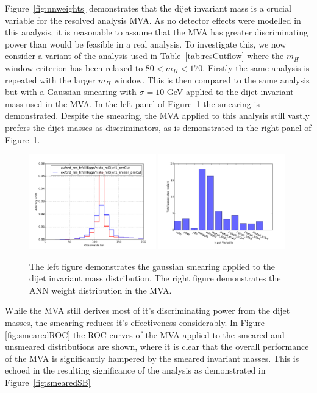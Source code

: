 \documentclass[12pt]{article}
\begin{document}
Figure~\ref{fig:nnweights} demonstrates that the dijet invariant mass is a crucial variable for the resolved analysis MVA. As no detector effects were modelled in this analysis, it is reasonable to assume that the MVA has greater discriminating power than would be feasible in a real analysis. To investigate this, we now consider a variant of the analysis used in Table~\ref{tab:resCutflow} where the $m_H$ window criterion has been relaxed to $80 < m_H < 170$. Firstly the same analysis is repeated with the larger $m_H$ window. This is then compared to the same analysis but with a Gaussian smearing with $\sigma=10$ GeV applied to the dijet invariant mass used in the MVA. In the left panel of Figure~\ref{fig:invMsmear} the smearing is demonstrated. Despite the smearing, the MVA applied to this analysis still vastly prefers the dijet masses as discriminators, as is demonstrated in the right panel of Figure~\ref{fig:invMsmear}.
            
\begin{figure}[h!]
\begin{center}
\includegraphics[width=0.49\textwidth]{plots/Msmear/histo_mass_smear_precut.pdf}
\includegraphics[width=0.49\textwidth]{plots/Msmear/nnweights.pdf}
\caption{The left figure demonstrates the gaussian smearing applied to the dijet invariant mass distribution. The right figure demonstrates the ANN weight distribution in the MVA.}
\label{fig:invMsmear}
\end{center}
\end{figure}

While the MVA still derives most of it's discriminating power from the dijet masses, the smearing reduces it's effectiveness considerably. In Figure \ref{fig:smearedROC} the ROC curves of the MVA applied to the smeared and unsmeared distributions are shown, where it is clear that the overall performance of the MVA is significantly hampered by the smeared invariant masses. This is echoed in the resulting significance of the analysis as demonstrated in Figure~\ref{fig:smearedSB}
\end{document}

